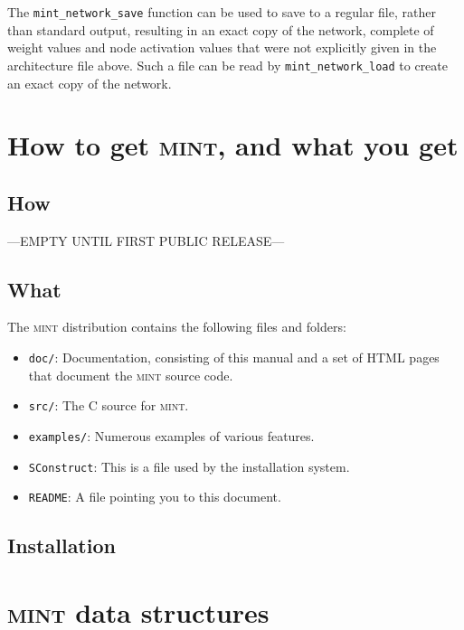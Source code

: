 \documentclass[11pt,letterpaper]{memoir}
\newcommand{\mint}{{\scshape\sffamily mint}\xspace}
\begin{document}
The \lstinline{mint_network_save} function can be used to save to a
regular file, rather than standard output, resulting in an exact copy
of the network, complete of weight values and node activation values
that were not explicitly given in the architecture file above. Such a
file can be read by \lstinline{mint_network_load} to create an exact
copy of the network.


\chapter{How to get \mint, and what you get}
\label{sec:install}

\section{How}

---EMPTY UNTIL FIRST PUBLIC RELEASE--- 

\section{What}

The \mint distribution contains the following files and folders:
\begin{itemize}
\item \lstinline{doc/}: Documentation, consisting of this manual and a
  set of HTML pages that document the \mint source code.
\item \lstinline{src/}: The C source for \mint.
\item \lstinline{examples/}: Numerous examples of various features.
\item \lstinline{SConstruct}: This is a file used by the installation system.
\item \lstinline{README}: A file pointing you to this document. 
\end{itemize}

\section{Installation}


\chapter{\mint data structures}
\label{cha:mint-data-structures}
\end{document}
